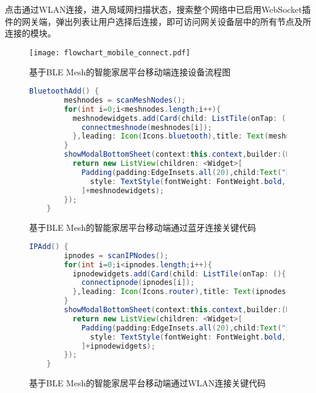 点击通过WLAN连接，进入局域网扫描状态，搜索整个网络中已启用WebSocket插件的网关端，弹出列表让用户选择后连接，即可访问网关设备层中的所有节点及所连接的模块。

\begin{figure}[H]
    \centering
    \texttt{[image: flowchart\_mobile\_connect.pdf]}
    \caption{基于BLE Mesh的智能家居平台移动端连接设备流程图}
    \label{fig:flowchart_mobile_connect}
\end{figure}

\begin{figure}[H]
    \centering
    \begin{lstlisting}[language=Java]
    BluetoothAdd() {
        meshnodes = scanMeshNodes();
        for(int i=0;i<meshnodes.length;i++){
          meshnodewidgets.add(Card(child: ListTile(onTap: (){
            connectmeshnode(meshnodes[i]);
          },leading: Icon(Icons.bluetooth),title: Text(meshnodes[i].name))));
        }
        showModalBottomSheet(context:this.context,builder:(BuildContext context) {
          return new ListView(children: <Widget>[
            Padding(padding:EdgeInsets.all(20),child:Text("选择 BLE Mesh 节点",textAlign: TextAlign.left,
              style: TextStyle(fontWeight: FontWeight.bold,fontSize: 20),)),
            ]+meshnodewidgets);
        });
    }
    \end{lstlisting}
    \caption{基于BLE Mesh的智能家居平台移动端通过蓝牙连接关键代码}
    \label{fig:code_mobile_connect_ble}
\end{figure}

\begin{figure}[H]
    \centering
    \begin{lstlisting}[language=Java]
    IPAdd() {
        ipnodes = scanIPNodes();
        for(int i=0;i<ipnodes.length;i++){
          ipnodewidgets.add(Card(child: ListTile(onTap: (){
            connectipnode(ipnodes[i]);
          },leading: Icon(Icons.router),title: Text(ipnodes[i].name),subtitle: Text(ipnodes[i].address))));
        }
        showModalBottomSheet(context:this.context,builder:(BuildContext context) {
          return new ListView(children: <Widget>[
            Padding(padding:EdgeInsets.all(20),child:Text("选择网关",textAlign: TextAlign.left,
              style: TextStyle(fontWeight: FontWeight.bold,fontSize: 20),)),
            ]+ipnodewidgets);
        });
    }
    \end{lstlisting}
    \caption{基于BLE Mesh的智能家居平台移动端通过WLAN连接关键代码}
    \label{fig:code_mobile_connect_wlan}
\end{figure}

